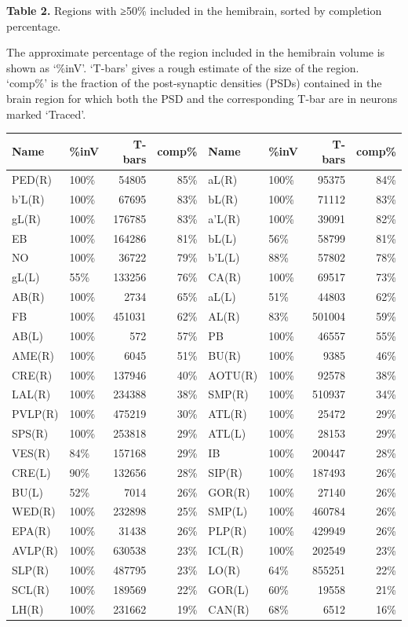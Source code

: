 \documentclass{article}
\begin{document}
\noindent \textbf{Table 2.} Regions with ≥50\% included in the hemibrain, sorted by completion percentage.

\noindent The approximate percentage of the region included in the hemibrain volume is shown as ‘\%inV’. ‘T-bars’ gives a rough estimate of the size of the region. ‘comp\%’ is the fraction of the post-synaptic densities (PSDs) contained in the brain region for which both the PSD and the corresponding T-bar are in neurons marked ‘Traced’.
\begin{center}\footnotesize
\begin{longtable}{llrrllrr}
\textbf{Name} & \textbf{\%inV} & \textbf{T-bars} & \textbf{comp\%} & \textbf{Name} & \textbf{\%inV} & \textbf{T-bars} & \textbf{comp\%} \\
\hline
PED(R) & 100\% & 54805 & 85\% & aL(R) & 100\% & 95375 & 84\% \\
b’L(R) & 100\% & 67695 & 83\% & bL(R) & 100\% & 71112 & 83\% \\
gL(R) & 100\% & 176785 & 83\% & a’L(R) & 100\% & 39091 & 82\% \\
EB & 100\% & 164286 & 81\% & bL(L) & 56\% & 58799 & 81\% \\
NO & 100\% & 36722 & 79\% & b’L(L) & 88\% & 57802 & 78\% \\
gL(L) & 55\% & 133256 & 76\% & CA(R) & 100\% & 69517 & 73\% \\
AB(R) & 100\% & 2734 & 65\% & aL(L) & 51\% & 44803 & 62\% \\
FB & 100\% & 451031 & 62\% & AL(R) & 83\% & 501004 & 59\% \\
AB(L) & 100\% & 572 & 57\% & PB & 100\% & 46557 & 55\% \\
AME(R) & 100\% & 6045 & 51\% & BU(R) & 100\% & 9385 & 46\% \\
CRE(R) & 100\% & 137946 & 40\% & AOTU(R) & 100\% & 92578 & 38\% \\
LAL(R) & 100\% & 234388 & 38\% & SMP(R) & 100\% & 510937 & 34\% \\
PVLP(R) & 100\% & 475219 & 30\% & ATL(R) & 100\% & 25472 & 29\% \\
SPS(R) & 100\% & 253818 & 29\% & ATL(L) & 100\% & 28153 & 29\% \\
VES(R) & 84\% & 157168 & 29\% & IB & 100\% & 200447 & 28\% \\
CRE(L) & 90\% & 132656 & 28\% & SIP(R) & 100\% & 187493 & 26\% \\
BU(L) & 52\% & 7014 & 26\% & GOR(R) & 100\% & 27140 & 26\% \\
WED(R) & 100\% & 232898 & 25\% & SMP(L) & 100\% & 460784 & 26\% \\
EPA(R) & 100\% & 31438 & 26\% & PLP(R) & 100\% & 429949 & 26\% \\
AVLP(R) & 100\% & 630538 & 23\% & ICL(R) & 100\% & 202549 & 23\% \\
SLP(R) & 100\% & 487795 & 23\% & LO(R) & 64\% & 855251 & 22\% \\
SCL(R) & 100\% & 189569 & 22\% & GOR(L) & 60\% & 19558 & 21\% \\
LH(R) & 100\% & 231662 & 19\% & CAN(R) & 68\% & 6512 & 16\% \\
\end{longtable}
\end{center}
\end{document}
